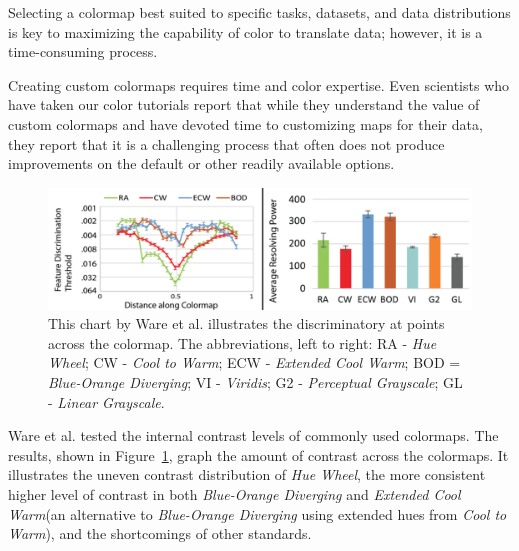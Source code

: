 \documentclass{IEEEcsmag}
\newcommand*{\km}[1]{\textcolor{km}{\emph{\textbf{#1} -- KM}}}
\newcommand*{\fs}[1]{\textcolor{fs}{\emph{\textbf{#1} -- FS}}}
\newcommand*{\colormap}[1]{\textsl{#1}\xspace}
\newcommand*{\huewheel}{\colormap{Hue Wheel}}
\newcommand*{\coolwarm}{\colormap{Cool to Warm}}
\newcommand*{\blueorange}{\colormap{Blue-Orange Diverging}}
\newcommand*{\extendedcoolwarm}{\colormap{Extended Cool Warm}}
\begin{document}
Selecting a colormap best suited to specific tasks, datasets, and data distributions is key to maximizing the capability of color to translate data; however, it is a time-consuming process.

Creating custom colormaps requires time and color expertise. Even scientists who have taken our color tutorials report that while they understand the value of custom colormaps and have devoted time to customizing maps for their data, they report that it is a challenging process that often does not produce improvements on the default or other readily available options.





\begin{figure}
\includegraphics[width=\linewidth]{pics/Ware17.png}
\caption{This chart by Ware et al. \cite{Ware2017} illustrates the discriminatory at points across the colormap. The abbreviations, left to right: RA - \huewheel; CW - \coolwarm; ECW - \extendedcoolwarm; BOD = \blueorange; VI - \colormap{Viridis}; G2 - \colormap{Perceptual Grayscale}; GL - \colormap{Linear Grayscale}. }
\label{fig:ware}
\end{figure}


Ware et al. \cite{Ware2017} tested the internal contrast levels of commonly used colormaps.
The results, shown in Figure~\ref{fig:ware}, graph the amount of contrast across the colormaps.
It illustrates the uneven contrast distribution of \huewheel, the more consistent higher level of contrast in both \blueorange and \extendedcoolwarm (an alternative to \blueorange using extended hues from \coolwarm), and the shortcomings of other standards.
\end{document}
